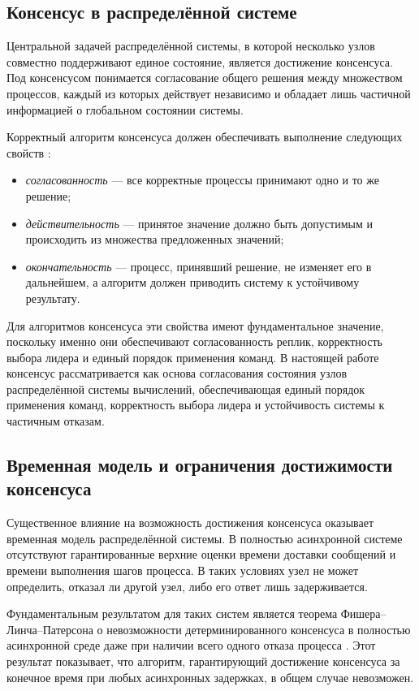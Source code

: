 \subsection{Консенсус в распределённой системе}

Центральной задачей распределённой системы, в которой несколько узлов совместно
поддерживают единое состояние, является достижение консенсуса. Под консенсусом
понимается согласование общего решения между множеством процессов, каждый из
которых действует независимо и обладает лишь частичной информацией о глобальном
состоянии системы.

Корректный алгоритм консенсуса должен обеспечивать выполнение следующих свойств
\cite{petrov}:

\begin{itemize}
    \item \textit{согласованность} --- все корректные процессы принимают одно и
то же решение;
    \item \textit{действительность} --- принятое значение должно быть
допустимым и происходить из множества предложенных значений;
    \item \textit{окончательность} --- процесс, принявший решение, не изменяет
его в дальнейшем, а алгоритм должен приводить систему к устойчивому результату.
\end{itemize}

Для алгоритмов консенсуса эти свойства имеют фундаментальное значение,
поскольку именно они обеспечивают согласованность реплик, корректность выбора
лидера и единый порядок применения команд. В настоящей работе консенсус
рассматривается как основа согласования состояния узлов распределённой системы
вычислений, обеспечивающая единый порядок применения команд, корректность
выбора лидера и устойчивость системы к частичным отказам.

\subsection{Временная модель и ограничения достижимости консенсуса}

Существенное влияние на возможность достижения консенсуса оказывает временная
модель распределённой системы. В полностью асинхронной системе отсутствуют
гарантированные верхние оценки времени доставки сообщений и времени выполнения
шагов процесса. В таких условиях узел не может определить, отказал ли другой
узел, либо его ответ лишь задерживается.

Фундаментальным результатом для таких систем является теорема
Фишера--Линча--Патерсона о невозможности детерминированного консенсуса в
полностью асинхронной среде даже при наличии всего одного отказа процесса
\cite{fischer85}. Этот результат показывает, что алгоритм, гарантирующий
достижение консенсуса за конечное время при любых асинхронных задержках, в
общем случае невозможен.

